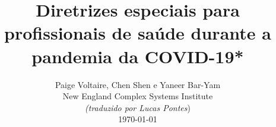 \documentclass[onecolumn,journal]{IEEEtran}
\begin{document}
\title{\color{Brown}  Diretrizes especiais para profissionais de saúde durante a pandemia da COVID-19*
\vspace{-0.35ex}}
\author{Paige Voltaire, Chen Shen e Yaneer Bar-Yam \\ New England Complex Systems Institute \\
\vspace{+0.35ex}
\small{\textit{(traduzido por Lucas Pontes})}\\
 \today
  \vspace{-8ex} \\
\textbf{}
 }

\maketitle




\thispagestyle{empty} %




\end{document}
